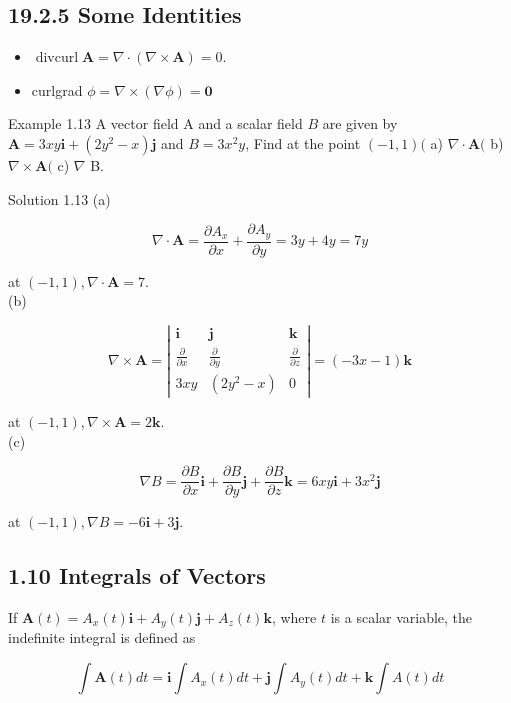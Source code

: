 \documentclass[10pt]{article}
\begin{document}
\subsection*{19.2.5 Some Identities}
\begin{itemize}
  \item $\operatorname{divcurl} \mathbf{A}=\nabla \cdot(\nabla \times \mathbf{A})=0$.
  \item curlgrad $\phi=\nabla \times(\nabla \phi)=\mathbf{0}$
\end{itemize}

Example 1.13 A vector field A and a scalar field $B$ are given by $\mathbf{A}=3 x y \mathbf{i}+\left(2 y^{2}-x\right) \mathbf{j}$ and $B=3 x^{2} y$, Find at the point $(-1,1)($ a) $\nabla \cdot \mathbf{A}($ b) $\nabla \times \mathbf{A}($ c) $\nabla$ B.

Solution 1.13 (a)

$$
\nabla \cdot \mathbf{A}=\frac{\partial A_{x}}{\partial x}+\frac{\partial A_{y}}{\partial y}=3 y+4 y=7 y
$$

at $(-1,1), \nabla \cdot \mathbf{A}=7$.\\
(b)

$$
\nabla \times \mathbf{A}=\left|\begin{array}{lll}
\mathbf{i} & \mathbf{j} & \mathbf{k} \\
\frac{\partial}{\partial x} & \frac{\partial}{\partial y} & \frac{\partial}{\partial z} \\
3 x y & \left(2 y^{2}-x\right) & 0
\end{array}\right|=(-3 x-1) \mathbf{k}
$$

at $(-1,1), \nabla \times \mathbf{A}=2 \mathbf{k}$.\\
(c)

$$
\nabla B=\frac{\partial B}{\partial x} \mathbf{i}+\frac{\partial B}{\partial y} \mathbf{j}+\frac{\partial B}{\partial z} \mathbf{k}=6 x y \mathbf{i}+3 x^{2} \mathbf{j}
$$

at $(-1,1), \nabla B=-6 \mathbf{i}+3 \mathbf{j}$.

\subsection*{1.10 Integrals of Vectors}
If $\mathbf{A}(t)=A_{x}(t) \mathbf{i}+A_{y}(t) \mathbf{j}+A_{z}(t) \mathbf{k}$, where $t$ is a scalar variable, the indefinite integral is defined as

$$
\int \mathbf{A}(t) d t=\mathbf{i} \int A_{x}(t) d t+\mathbf{j} \int A_{y}(t) d t+\mathbf{k} \int A(t) d t
$$
\end{document}
